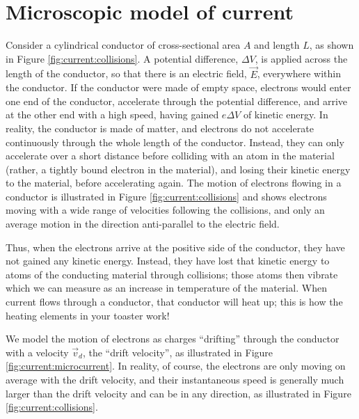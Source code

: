 \section{Microscopic model of current}
\label{sec:current:micromodel}
Consider a cylindrical conductor of cross-sectional area $A$ and length $L$, as shown in Figure \ref{fig:current:collisions}. A potential difference, $\Delta V$, is applied across the length of the conductor, so that there is an electric field, $\vec E$, everywhere within the conductor. If the conductor were made of empty space, electrons would enter one end of the conductor, accelerate through the potential difference, and arrive at the other end with a high speed, having gained $e\Delta V$ of kinetic energy. In reality, the conductor is made of matter, and electrons do not accelerate continuously through the whole length of the conductor. Instead, they can only accelerate over a short distance before colliding with an atom in the material (rather, a tightly bound electron in the material), and losing their kinetic energy to the material, before accelerating again. The motion of electrons flowing in a conductor is illustrated in Figure \ref{fig:current:collisions} and shows electrons moving with a wide range of velocities following the collisions, and only an average motion in the direction anti-parallel to the electric field.

Thus, when the electrons arrive at the positive side of the conductor, they have not gained any kinetic energy. Instead, they have lost that kinetic energy to atoms of the conducting material through collisions; those atoms then vibrate which we can measure as an increase in temperature of the material. When current flows through a conductor, that conductor will heat up; this is how the heating elements in your toaster work!

We model the motion of electrons as charges ``drifting'' through the conductor with a velocity $\vec v_d$, the ``drift velocity'', as illustrated in Figure \ref{fig:current:microcurrent}. In reality, of course, the electrons are only moving on average with the drift velocity, and their instantaneous speed is generally much larger than the drift velocity and can be in any direction, as illustrated in Figure \ref{fig:current:collisions}.

